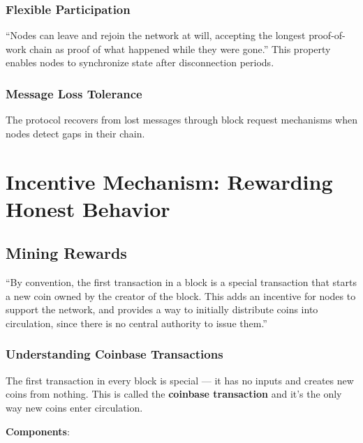 \subsubsection{Flexible Participation}

``Nodes can leave and rejoin the network at will, accepting the longest proof-of-work chain as proof of what happened while they were gone.'' This property enables nodes to synchronize state after disconnection periods.

\subsubsection{Message Loss Tolerance}

The protocol recovers from lost messages through block request mechanisms when nodes detect gaps in their chain.


\section{Incentive Mechanism: Rewarding Honest Behavior}
\label{sec:incentives}

\subsection{Mining Rewards}
\label{subsec:mining-rewards}

``By convention, the first transaction in a block is a special transaction that starts a new coin owned by the creator of the block. This adds an incentive for nodes to support the network, and provides a way to initially distribute coins into circulation, since there is no central authority to issue them.''

\subsubsection{Understanding Coinbase Transactions}

The first transaction in every block is special --- it has no inputs and creates new coins from nothing. This is called the \textbf{coinbase transaction} and it's the only way new coins enter circulation.

\textbf{Components}:

